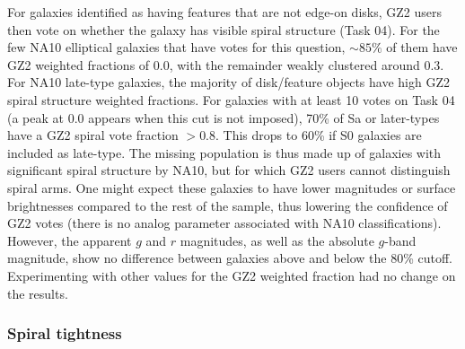 \documentclass[useAMS,usenatbib]{mn2e}
\begin{document}
For galaxies identified as having features that are not edge-on disks, GZ2 users then vote on whether the galaxy has visible spiral structure (Task 04). For the few NA10 elliptical galaxies that have votes for this question, $\sim85\%$ of them have GZ2 weighted fractions of 0.0, with the remainder weakly clustered around 0.3. For NA10 late-type galaxies, the majority of disk/feature objects have high GZ2 spiral structure weighted fractions. For galaxies with at least 10 votes on Task 04 (a peak at 0.0 appears when this cut is not imposed), 70\% of Sa or later-types have a GZ2 spiral vote fraction $>0.8$. This drops to 60\% if S0 galaxies are included as late-type. The missing population is thus made up of galaxies with significant spiral structure by NA10, but for which GZ2 users cannot distinguish spiral arms. One might expect these galaxies to have lower magnitudes or surface brightnesses compared to the rest of the sample, thus lowering the confidence of GZ2 votes (there is no analog parameter associated with NA10 classifications). However, the apparent $g$ and $r$ magnitudes, as well as the absolute $g$-band magnitude, show no difference between galaxies above and below the 80\% cutoff. Experimenting with other values for the GZ2 weighted fraction had no change on the results.  

\subsubsection{Spiral tightness}
\end{document}
